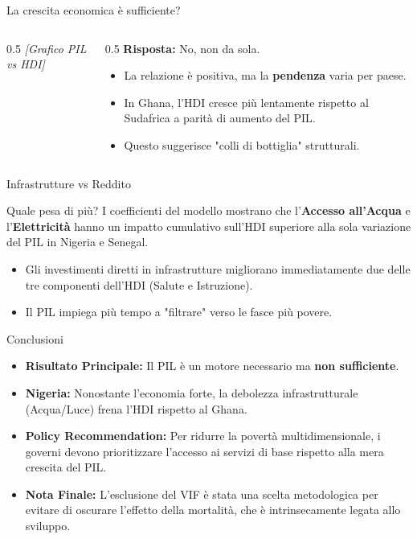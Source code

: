 \documentclass{beamer}
\begin{document}
\begin{frame}{La crescita economica è sufficiente?}
    \begin{columns}
        \begin{column}{0.5\textwidth}
            \centering \textit{[Grafico PIL vs HDI]}
        \end{column}
        \begin{column}{0.5\textwidth}
            \textbf{Risposta:} No, non da sola.
            \begin{itemize}
                \item La relazione è positiva, ma la \textbf{pendenza} varia per paese.
                \item In Ghana, l'HDI cresce più lentamente rispetto al Sudafrica a parità di aumento del PIL.
                \item Questo suggerisce "colli di bottiglia" strutturali.
            \end{itemize}
        \end{column}
    \end{columns}
\end{frame}

\begin{frame}{Infrastrutture vs Reddito}
    \begin{block}{Quale pesa di più?}
        I coefficienti del modello mostrano che l'\textbf{Accesso all'Acqua} e l'\textbf{Elettricità} hanno un impatto cumulativo sull'HDI superiore alla sola variazione del PIL in Nigeria e Senegal.
    \end{block}
    \begin{itemize}
        \item Gli investimenti diretti in infrastrutture migliorano immediatamente due delle tre componenti dell'HDI (Salute e Istruzione).
        \item Il PIL impiega più tempo a "filtrare" verso le fasce più povere.
    \end{itemize}
\end{frame}

\begin{frame}{Conclusioni}
    \begin{itemize}
        \item \textbf{Risultato Principale:} Il PIL è un motore necessario ma \textbf{non sufficiente}.
        \item \textbf{Nigeria:} Nonostante l'economia forte, la debolezza infrastrutturale (Acqua/Luce) frena l'HDI rispetto al Ghana.
        \item \textbf{Policy Recommendation:} Per ridurre la povertà multidimensionale, i governi devono prioritizzare l'accesso ai servizi di base rispetto alla mera crescita del PIL.
        \item \textbf{Nota Finale:} L'esclusione del VIF è stata una scelta metodologica per evitare di oscurare l'effetto della mortalità, che è intrinsecamente legata allo sviluppo.
    \end{itemize}
\end{frame}
\end{document}
